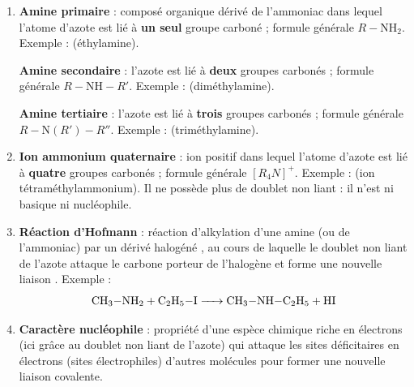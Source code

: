 \documentclass[11pt]{article}
\newcommand{\cle}[1]{{\popxbold\color{popdark}#1}}
\newcounter{popsec}
\newcounter{popsub}
\newcommand{\courssub}[1]{%
  \stepcounter{popsub}%
  \par\vspace{9pt}\noindent{\popxbold\fontsize{11.5}{13}\selectfont\color{popink}{\color{poporange}\thepopsec.\thepopsub}\hspace{6pt}#1}\par\nopagebreak\vspace{4pt}
}
\begin{document}
\begin{corrige}
\begin{enumerate}
\item \textbf{Amine primaire} : composé organique dérivé de l'ammoniac dans lequel l'atome d'azote est lié à \textbf{un seul} groupe carboné ; formule générale $R-\mathrm{NH}_2$. Exemple :  (éthylamine).

\textbf{Amine secondaire} : l'azote est lié à \textbf{deux} groupes carbonés ; formule générale $R-\mathrm{NH}-R'$. Exemple :  (diméthylamine).

\textbf{Amine tertiaire} : l'azote est lié à \textbf{trois} groupes carbonés ; formule générale $R-\mathrm{N}(R')-R''$. Exemple :  (triméthylamine).
\item \textbf{Ion ammonium quaternaire} : ion positif dans lequel l'atome d'azote est lié à \textbf{quatre} groupes carbonés ; formule générale $[R_4N]^+$. Exemple : \ce{[(CH3)4N]+} (ion tétraméthylammonium). Il ne possède plus de doublet non liant : il n'est ni basique ni nucléophile.
\item \textbf{Réaction d'Hofmann} : réaction d'\cle{alkylation} d'une amine (ou de l'ammoniac) par un dérivé halogéné , au cours de laquelle le doublet non liant de l'azote attaque le carbone porteur de l'halogène et forme une nouvelle liaison . Exemple :
\[ \ce{CH3-NH2 + C2H5-I -> CH3-NH-C2H5 + HI} \]
\item \textbf{Caractère nucléophile} : propriété d'une espèce chimique riche en électrons (ici grâce au doublet non liant de l'azote) qui attaque les sites déficitaires en électrons (sites électrophiles) d'autres molécules pour former une nouvelle liaison covalente.
\end{enumerate}
\end{corrige}

\courssub{Je m'entraîne}
\end{document}
